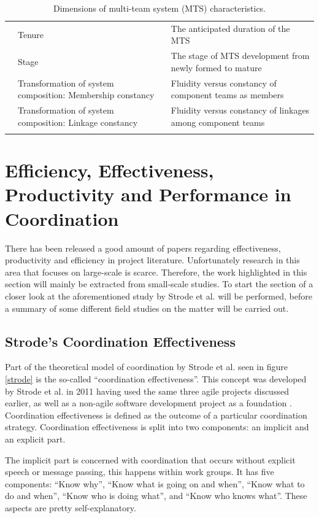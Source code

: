 \begin{center}
\begin{longtable}{ | p{2.25cm} | p{2.75cm} | p{6.10cm} | }
	& Tenure & The anticipated duration of the MTS \\ \cline{2-3}
	& Stage & The stage of MTS development from newly formed to mature \\ \cline{2-3}
	& Transformation of system composition: Membership constancy & Fluidity versus constancy of component teams as members \\ \cline{2-3}
	& Transformation of system composition: Linkage constancy & Fluidity versus constancy of linkages among component teams \\ \cline{2-3}
	\hline
\caption{Dimensions of multi-team system (MTS) characteristics.}
\label{domsc}
\end{longtable}
\end{center}

\section{Efficiency, Effectiveness, Productivity and Performance in Coordination}
\label{efficiency}

There has been released a good amount of papers regarding effectiveness, productivity and efficiency in project literature. Unfortunately research in this area that focuses on large-scale is scarce. Therefore, the work highlighted in this section will mainly be extracted from small-scale studies. To start the section of a closer look at the aforementioned study by Strode et al. \cite{Strode2011} will be performed, before a summary of some different field studies on the matter will be carried out.

\subsection{Strode's Coordination Effectiveness}
\label{cordinationeffectiveness}

Part of the theoretical model of coordination by Strode et al. seen in figure \ref{strode} is the so-called ``coordination effectiveness''. This concept was developed by Strode et al. in 2011 having used the same three agile projects discussed earlier, as well as a non-agile software development project as a foundation \cite{Strode2011}. Coordination effectiveness is defined as the outcome of a particular coordination strategy. Coordination effectiveness is split into two components: an implicit and an explicit part.

The implicit part is concerned with coordination that occurs without explicit speech or message passing, this happens within work groups. It has five components: ``Know why'', ``Know what is going on and when'', ``Know what to do and when'', ``Know who is doing what'', and ``Know who knows what''. These aspects are pretty self-explanatory.


